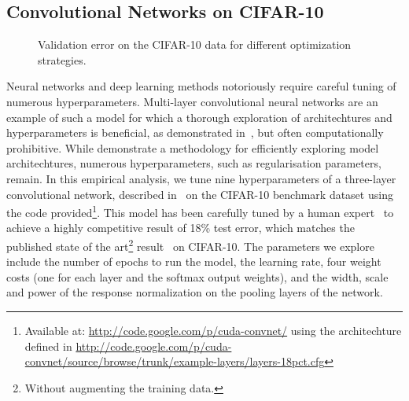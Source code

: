 \documentclass[aos,preprint]{imsart}
\begin{document}
\subsection{Convolutional Networks on CIFAR-10}
\begin{figure}[ht]
\begin{center}
\end{center}
\caption{Validation error on the CIFAR-10 data for different optimization strategies.}
\label{fig:convnet}
\end{figure}

Neural networks and deep learning methods notoriously require careful
tuning of numerous hyperparameters.  Multi-layer convolutional neural
networks are an example of such a model for which a thorough
exploration of architechtures and hyperparameters is beneficial, as
demonstrated in~\citet{Saxe-etal-2011}, but often computationally
prohibitive.  While \citet{Saxe-etal-2011} demonstrate a methodology
for efficiently exploring model architechtures, numerous
hyperparameters, such as regularisation parameters, remain. In this
empirical analysis, we tune nine hyperparameters of a three-layer
convolutional network, described in~\citet{Krizhevsky-2009a} on the
CIFAR-10 benchmark dataset using the code provided\footnote{Available
  at: \url{http://code.google.com/p/cuda-convnet/} using the architechture
  defined in
  \url{http://code.google.com/p/cuda-convnet/source/browse/trunk/example-layers/layers-18pct.cfg}}.
This model has been carefully tuned by a human
expert~\citep{Krizhevsky-2009a} to achieve a highly competitive result
of 18\% test error, which matches the published state of the
art\footnote{Without augmenting the training data.}
result~\citep{Coates-2011a} on CIFAR-10. The parameters we explore
include the number of epochs to run the model, the learning rate, four
weight costs (one for each layer and the softmax output weights), and
the width, scale and power of the response normalization on the
pooling layers of the network.
\end{document}

